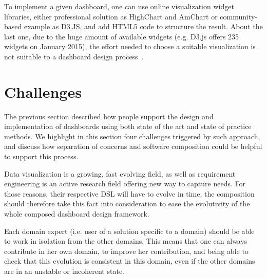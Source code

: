 \documentclass{acm_proc_article-sp}
\begin{document}
To implement a given dashboard, one can use online visualization widget
libraries, either professional solution as HighChart and AmChart or
community-based example as D3.JS, and add HTML5 code to structure the
result.
About the last one, due to the huge amount of available widgets
(e.g. D3.js offers 235 widgets on January 2015), the effort needed to
choose a suitable visualization is not suitable to a dashboard design
process~\cite{ecmfa}.


\section{Challenges}

The previous section described how people support the design and
implementation of dashboards using both state of the art and state of
practice methods. We highlight in this section four challenges
triggered by such approach, and discuss how separation of concerns and
software composition could be helpful to support this process.


Data visualization is a growing, fast evolving field, as well as
requirement engineering is an active research field offering new way
to capture needs.  For those reasons, their respective DSL will have
to evolve in time, the composition should therefore take this fact
into consideration to ease the evolutivity of the whole composed
dashboard design framework.

Each domain expert (i.e. user of a solution specific to a domain)
should be able to work in isolation from the other domains. This means
that one can always contribute in her own domain, to improve her
contribution, and being able to check that this evolution is
consistent in this domain, even if the other domains are in an
unstable or incoherent state.
\end{document}
